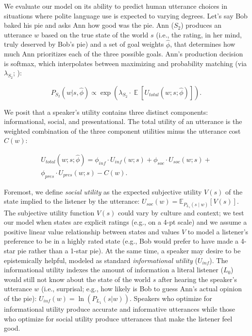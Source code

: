 \documentclass[9pt,twocolumn,twoside,lineno]{main_class_file}
\begin{document}
We evaluate our model on its ability to predict human utterance choices
in situations where polite language use is expected to varying degrees. 
Let's say Bob baked his pie and asks Ann how good was the pie.
Ann (\(S_2\)) produces an utterance \(w\) based on the true state of the world \(s\) (i.e., the
rating, in her mind, truly deserved by Bob's pie) and a set of goal weights
\(\hat{\phi}\), that determines how much Ann prioritizes each of the three possible goals.
Ann's production decision is softmax, which interpolates between
maximizing and probability matching (via \(\lambda_{S_2}\); \cite{goodman2013}):

\begin{equation}
P_{S_2}(w | s, \hat{\phi}) \propto \exp(\lambda_{S_2} \cdot \mathop{\mathbb{E}}[U_{total}(w; s; \hat{\phi})]).
\end{equation} 

We posit that a speaker's utility contains three distinct components: informational, social, and presentational. The
total utility of an utterance is the weighted combination of the three component utilities minus the utterance cost \(C(w)\):

\begin{equation}
\begin{split}
U_{total}(w; s; \hat{\phi}) = \phi_{inf} \cdot U_{inf}(w; s) + \phi_{soc} \cdot U_{soc}(w; s) + \\ \phi_{pres} \cdot U_{pres}(w; s) - C(w). 
\end{split}
\end{equation}

Foremost, we define \emph{social utility} as the expected subjective utility \(V(s)\) of the state implied to the
listener by the utterance: \(U_{soc}(w) = \mathbb{E}_{P_{L_1}(s \mid w)}[V(s)]\). 
The subjective utility function \(V(s)\) could vary by culture and context; we test our model when states are explicit ratings (e.g., on a 4-pt scale) and we assume a positive linear value relationship between states and values \(V\) to model a listener's preference to be in a highly rated state (e.g., Bob would prefer to have made a 4-star pie rather than a 1-star pie).
At the same time, a speaker may desire to be epistemically helpful, modeled as standard \emph{informational utility} (\(U_{inf}\)).
The informational utility indexes the amount of information a literal listener (\(L_0\)) would still not know about the state of the world \(s\) after hearing the speaker's utterance \(w\) (i.e., surprisal; e.g., how likely is Bob to guess Ann's actual opinion of the pie): \(U_{inf}(w) = \ln(P_{L_1}(s | w))\).
Speakers who optimize for informational utility produce accurate and informative utterances while those who optimize for social utility produce utterances that make the listener feel good.
\end{document}
